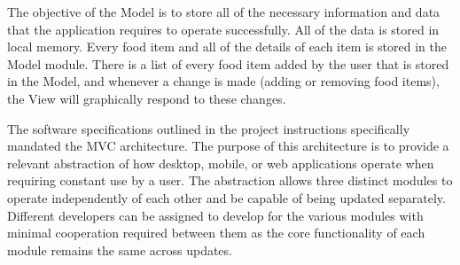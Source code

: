 \documentclass{scrreprt}
\begin{document}
The objective of the Model is to store all of the necessary information and data that the application requires to operate successfully. All of the data is stored in local memory. Every food item and all of the details of each item is stored in the Model module. There is a list of every food item added by the user that is stored in the Model, and whenever a change is made (adding or removing food items), the View will graphically respond to these changes. \\

\begin{figure}[ht]
\centering
{}
\caption{}
\end{figure}

The software specifications outlined in the project instructions specifically mandated the MVC architecture. The purpose of this architecture is to provide a relevant abstraction of how desktop, mobile, or web applications operate when requiring constant use by a user. The abstraction allows three distinct modules to operate independently of each other and be capable of being updated separately. Different developers can be assigned to develop for the various modules with minimal cooperation required between them as the core functionality of each module remains the same across updates.
\end{document}
